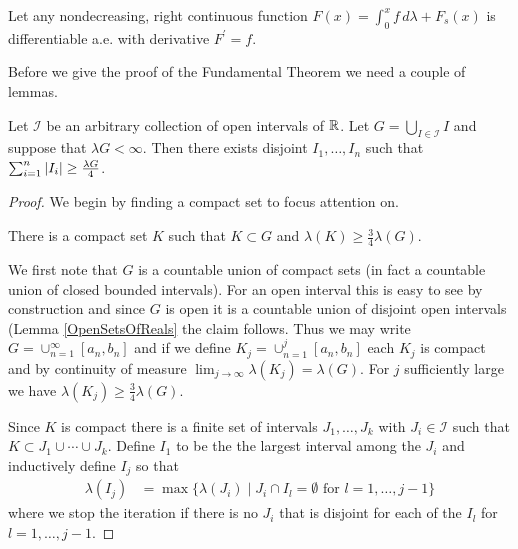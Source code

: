 \begin{thm}\label{FundamentalTheoremOfCalculus}Let any nondecreasing, right continuous function $F(x) = \int_0^x
  f \, d\lambda + F_s(x)$ is differentiable a.e. with derivative $F^\prime = f$.
\end{thm}
Before we give the proof of the Fundamental Theorem we need a couple of lemmas.
\begin{lem}\label{IntervalSelection}Let $\mathcal{I}$ be an arbitrary
  collection of open intervals of $\mathbb{R}$.  Let $G = \bigcup_{I \in
    \mathcal{I}} I$ and suppose that $\lambda G < \infty$.  Then there
  exists disjoint $I_1, \dots, I_n$ such that $\sum_{i=1}^n \left \vert I_i \right \vert
  \geq \frac{\lambda G}{4}$.
\end{lem}
\begin{proof}
We begin by finding a compact set to focus attention on.
\begin{clm}There is a compact set $K$ such that $K \subset G$ and $\lambda(K) \geq \frac{3}{4} \lambda (G)$.
\end{clm}
We first note that $G$ is a countable union of compact sets (in fact a
countable union of closed bounded intervals).  For an open interval
this is easy to see by construction and since $G$ is open it is a countable union of disjoint
open intervals (Lemma \ref{OpenSetsOfReals} the claim follows.  Thus we may write $G = \cup_{n=1}^\infty [a_n,b_n]$ and
if we define $K_j = \cup_{n=1}^j [a_n,b_n]$ each $K_j$ is compact and by continuity of measure 
$\lim_{j \to \infty} \lambda(K_j) = \lambda(G)$.  For $j$ sufficiently large we have $\lambda(K_j) \geq \frac{3}{4} \lambda (G)$.

Since $K$ is compact there is a finite set of intervals $J_1, \dotsc, J_k$ with $J_i \in \mathcal{I}$ such that $K \subset J_1 \cup \dotsb \cup J_k$.
Define $I_1$ to be the the largest interval among the $J_i$ and inductively define $I_j$ so that
\begin{align*}
\lambda(I_j) &= \max \lbrace \lambda(J_i) \mid J_i \cap I_l = \emptyset \text{ for $l=1, \dotsc, j-1$} \rbrace
\end{align*}
where we stop the iteration if there is no $J_i$ that is disjoint for each of the $I_l$ for $l=1, \dotsc, j-1$.


\end{proof}
